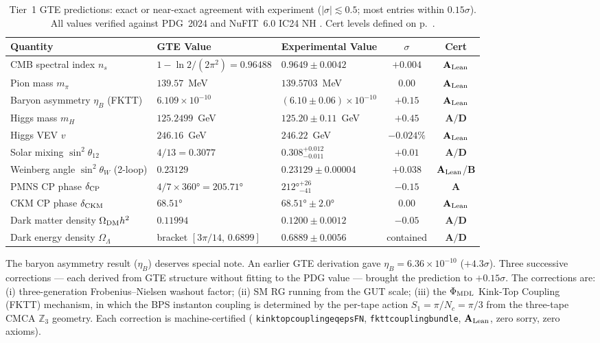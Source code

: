 \documentclass[11pt,openany]{book}
\theoremstyle{remark}
\newcommand{\lean}[1]{%
  \penalty-100
  \begingroup\def\_{\textunderscore\allowbreak}\texttt{#1}\endgroup}
\newcommand{\CatA}{\textbf{A}}
\newcommand{\CatAL}{\ensuremath{\textbf{A}_{\rm Lean}}}
\newcommand{\CatAD}{\textbf{A/D}}
\newcommand{\CatB}{\textbf{B}}
\begin{document}
\begin{table}[htbp]
\centering
\caption{Tier~1 GTE predictions: exact or near-exact agreement with experiment
($|\sigma| \lesssim 0.5$; most entries within $0.15\sigma$).
All values verified against PDG~2024 and NuFIT~6.0 IC24 NH \cite{ParticleDataGroup2024,NuFIT60}.
Cert levels defined on p.~\pageref{chap:taxonomy}.}
\label{tab:tier1}
\small
\begin{tabularx}{\textwidth}{@{}P{3.5cm}P{3.0cm}P{3.5cm}cc@{}}
\toprule
\textbf{Quantity} & \textbf{GTE Value} & \textbf{Experimental Value} & \textbf{$\sigma$} & \textbf{Cert} \\
\midrule
CMB spectral index $n_s$ & $1 - \ln2/(2\pi^2) = 0.96488$ & $0.9649 \pm 0.0042$ & $+0.004$ & $\CatAL$ \\
Pion mass $m_\pi$ & $139.57$~MeV & $139.5703$~MeV & $0.00$ & $\CatAL$ \\
Baryon asymmetry $\eta_B$ (FKTT) & $6.109\times10^{-10}$ & $(6.10 \pm 0.06)\times10^{-10}$ & $+0.15$ & $\CatAL$ \\
Higgs mass $m_H$ & $125.2499$~GeV & $125.20 \pm 0.11$~GeV & $+0.45$ & $\CatAD$ \\
Higgs VEV $v$ & $246.16$~GeV & $246.22$~GeV & $-0.024\%$ & $\CatAL$ \\
Solar mixing $\sin^2\theta_{12}$ & $4/13 = 0.3077$ & $0.308^{+0.012}_{-0.011}$ & $+0.01$ & $\CatAD$ \\
Weinberg angle $\sin^2\theta_W$ (2-loop) & $0.23129$ & $0.23129 \pm 0.00004$ & $+0.038$ & $\CatAL$/$\CatB$ \\
PMNS CP phase $\delta_{\rm CP}$ & $4/7 \times 360° = 205.71°$ & $212°^{+26}_{-41}$ & $-0.15$ & $\CatA$ \\
CKM CP phase $\delta_{\rm CKM}$ & $68.51°$ & $68.51° \pm 2.0°$ & $0.00$ & $\CatAL$ \\
Dark matter density $\Omega_{\rm DM}h^2$ & $0.11994$ & $0.1200 \pm 0.0012$ & $-0.05$ & $\CatAD$ \\
Dark energy density $\Omega_\Lambda$ & bracket $[3\pi/14,\,0.6899]$ & $0.6889 \pm 0.0056$ & contained & $\CatAD$ \\
\bottomrule
\end{tabularx}
\end{table}

\FloatBarrier

The baryon asymmetry result ($\eta_B$) deserves special note.
An earlier GTE derivation gave $\eta_B = 6.36\times10^{-10}$ ($+4.3\sigma$).
Three successive corrections --- each derived from GTE structure without fitting to the
PDG value --- brought the prediction to $+0.15\sigma$.
The corrections are: (i) three-generation Frobenius--Nielsen washout factor; (ii) SM
RG running from the GUT scale; (iii) the $\Phi_{\rm MDL}$ Kink-Top Coupling (FKTT)
mechanism, in which the BPS instanton coupling is determined by the per-tape action
$S_1 = \pi/N_c = \pi/3$ from the three-tape CMCA $\mathbb{Z}_3$ geometry.
Each correction is machine-certified (\lean{kink\_top\_coupling\_eq\_eps\_FN},
\lean{fktt\_coupling\_bundle}, \CatAL, zero sorry, zero axioms).
\end{document}
